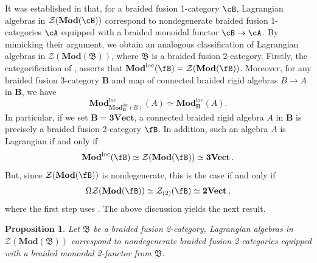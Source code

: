 \documentclass[11pt,reqno]{amsart}
\DeclareMathOperator{\loc}{\mathrm{loc}}
\newcommand{\Mod}{\mathbf{Mod}}
\newcommand{\tVect}{\mathbf{2Vect}}
\newcommand{\cZ}{\mathcal{Z}}
\numberwithin{equation}{section}
\theoremstyle{plain}
\newtheorem{prop}[equation]{Proposition}
\theoremstyle{definition}
\begin{document}
It was established in \cite[Corollary 3.3.4]{DX} that, for a braided fusion 1-category $\cB$, Lagrangian algebras in $\cZ(\Mod(\cB))$ correspond to nondegenerate braided fusion 1-categories $\cA$ equipped with a braided monoidal functor $\cB \rightarrow \cA$.
By mimicking their argument, we obtain an analogous classification of Lagrangian algebras in $\cZ(\mathbf{Mod}(\mathfrak{B}))$, where $\mathfrak{B}$ is a braided fusion 2-category.
Firstly, the categorification of \cite[Theorem 4.11]{davydov2021braided}, asserts that $\Mod^{\loc}(\fB) = \cZ(\Mod(\fB))$.
Moreover, for any braided fusion 3-category $\mathbf{B}$ and map of connected braided rigid algebras $B\rightarrow A$ in $\mathbf{B}$, we have $$\Mod^{\loc}_{\Mod^{\loc}_{\mathbf{B}}(B)}(A)\simeq \Mod^{\loc}_\mathbf{B}(A).$$ In particular, if we set $\mathbf{B} = \mathbf{3Vect}$, a connected braided rigid algebra $A$ in $\mathbf{B}$ is precisely a braided fusion 2-category $\fB$. In addition, such an algebra $A$ is Lagrangian if and only if $$\Mod^{\loc}(\fB) \simeq \cZ(\Mod(\fB)) \simeq \mathbf{3Vect}\,.$$ But, since $\cZ(\Mod(\fB))$ is nondegenerate, this is the case if and only if $$\Omega\cZ(\Mod(\fB))\simeq\mathcal{Z}_{(2)}(\fB) \simeq \tVect\,,$$ where the first step uses \cite[Section IV.B]{JF}. The above discussion yields the next result.

\begin{prop}\label{prop:LagrangianAlgebras}
    Let $\mathfrak{B}$ be a braided fusion 2-category, Lagrangian algebras in $\cZ(\mathbf{Mod}(\mathfrak{B}))$ correspond to nondegenerate braided fusion 2-categories equipped with a braided monoidal 2-functor from $\mathfrak{B}$.
\end{prop}
\end{document}
